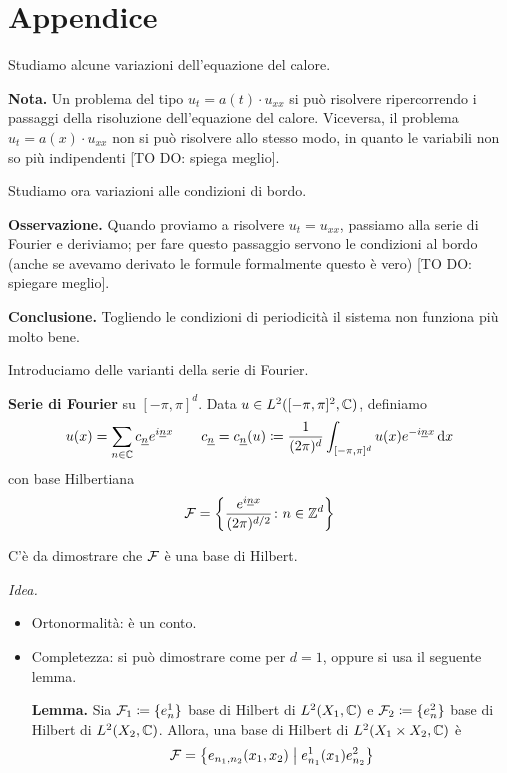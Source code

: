 \section{Appendice}

Studiamo alcune variazioni dell'equazione del calore.

\textbf{Nota.} Un problema del tipo $u_t = a(t) \cdot u_{xx}$ si può risolvere ripercorrendo i passaggi della risoluzione dell'equazione del calore.
Viceversa, il problema $u_t = a(x) \cdot u_{xx}$ non si può risolvere allo stesso modo, in quanto le variabili non so più indipendenti [TO DO: spiega meglio].

Studiamo ora variazioni alle condizioni di bordo.

\textbf{Osservazione.} Quando proviamo a risolvere $u_t = u_{xx}$, passiamo alla serie di Fourier e deriviamo; per fare questo passaggio servono le condizioni al bordo (anche se avevamo derivato le formule formalmente questo è vero) [TO DO: spiegare meglio].

\textbf{Conclusione.} Togliendo le condizioni di periodicità il sistema non funziona più molto bene.

Introduciamo delle varianti della serie di Fourier.

\textbf{Serie di Fourier} su $[-\pi,\pi]^d$. Data $u \in L^2([-\pi,\pi]^2, \mathbb C)$, definiamo
%
$$
	u(x) = \sum_{n \in \mathbb C} c_{\underline{n}} e^{i \underline{n} x} \qquad 
	c_{\underline{n}} = c_{\underline{n}} (u) \coloneqq \frac{1}{(2\pi)^d} \int_{[-\pi,\pi]^d} u(x) e^{- i \underline{n} x} \,\mathrm{d} x 
$$
%
con base Hilbertiana
%
$$
	\mathcal{F} = \left\{ \frac{e^{i \underline{n} x}}{(2\pi)^{d/2}} \colon n \in \mathbb Z^d \right\}
$$
%

C'è da dimostrare che $\mathcal{F}$ è una base di Hilbert.

\textit{Idea.}
\begin{itemize}

	\item Ortonormalità: è un conto.


	\item Completezza: si può dimostrare come per $d = 1$, oppure si usa il seguente lemma.

	\textbf{Lemma.} Sia $\mathcal{F}_1 \coloneqq \{ e_n^1 \}$ base di Hilbert di $L^2(X_1, \mathbb C)$ e $\mathcal{F}_2 \coloneqq \{ e_n^2 \}$ base di Hilbert di $L^2(X_2, \mathbb C)$. Allora, una base di Hilbert di $L^2(X_1 \times X_2, \mathbb C)$ è
	$$
		\mathcal{F} = \left\{ e_{n_1,n_2}(x_1,x_2) \;\middle|\; e_{n_1}^1 (x_1) e_{n_2}^2 \right\}
	$$

\end{itemize}

